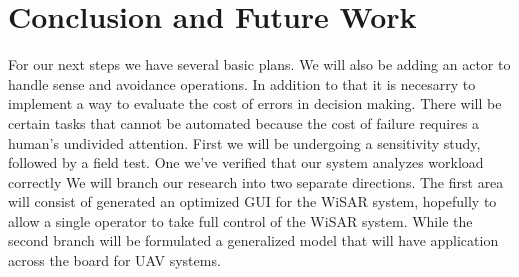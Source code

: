 \section{Conclusion and Future Work}


For our next steps we have several basic plans. We will also be adding an actor to handle sense and avoidance operations. In addition to that it is necesarry to implement a way to evaluate the cost of errors in decision making. There will be certain tasks that cannot be automated because the cost of failure requires a human's undivided attention. First we will be undergoing a sensitivity study, followed by a field test. One we've verified that our system analyzes workload correctly We will branch our research into two separate directions. The first area will consist of generated an optimized GUI for the WiSAR system, hopefully to allow a single operator to take full control of the WiSAR system. While the second branch will be formulated a generalized model that will have application across the board for UAV systems.
